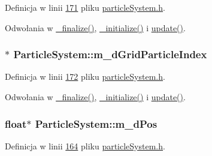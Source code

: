 Definicja w linii \hyperlink{particle_system_8h_source_l00171}{171} pliku \hyperlink{particle_system_8h_source}{particle\-System.\-h}.



Odwołania w \hyperlink{particle_system_8cpp_source_l00205}{\-\_\-finalize()}, \hyperlink{particle_system_8cpp_source_l00123}{\-\_\-initialize()} i \hyperlink{particle_system_8cpp_source_l00238}{update()}.

\hypertarget{class_particle_system_a1a67fc1e3ffd4e64f55a2a315c49c74c}{
\subsubsection[{m\-\_\-d\-Grid\-Particle\-Index}]{$\ast$ Particle\-System\-::m\-\_\-d\-Grid\-Particle\-Index\hspace{0.3cm}{\ttfamily [protected]}}}\label{class_particle_system_a1a67fc1e3ffd4e64f55a2a315c49c74c}


Definicja w linii \hyperlink{particle_system_8h_source_l00172}{172} pliku \hyperlink{particle_system_8h_source}{particle\-System.\-h}.



Odwołania w \hyperlink{particle_system_8cpp_source_l00205}{\-\_\-finalize()}, \hyperlink{particle_system_8cpp_source_l00123}{\-\_\-initialize()} i \hyperlink{particle_system_8cpp_source_l00238}{update()}.

\hypertarget{class_particle_system_afff6217d2726217dff77c81ef3c23bfa}{
\subsubsection[{m\-\_\-d\-Pos}]{\setlength{\rightskip}{0pt plus 5cm}float$\ast$ Particle\-System\-::m\-\_\-d\-Pos\hspace{0.3cm}{\ttfamily [protected]}}}\label{class_particle_system_afff6217d2726217dff77c81ef3c23bfa}


Definicja w linii \hyperlink{particle_system_8h_source_l00164}{164} pliku \hyperlink{particle_system_8h_source}{particle\-System.\-h}.



